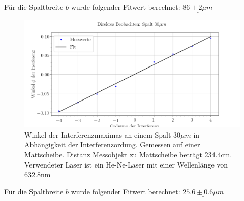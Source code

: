 Für die Spaltbreite $b$ wurde folgender Fitwert berechnet: $\underline{86\pm 2\mu m}$
\newpage


\begin{figure}[htb]
\includegraphics[width=\textwidth]{graphics/messung_1_2.png}
\caption{Winkel der Interferenzmaximas an einem Spalt $30\mu m$ in Abhängigkeit der Interferenzordung. Gemessen auf einer Mattscheibe. Distanz Messobjekt zu Mattscheibe beträgt 234.4cm. Verwendeter Laser ist ein He-Ne-Laser mit einer Wellenlänge von 632.8nm} %
\label{fig:messung_1_2}
\end{figure}

Für die Spaltbreite $b$ wurde folgender Fitwert berechnet: $\underline{25.6 \pm 0.6\mu m}$
